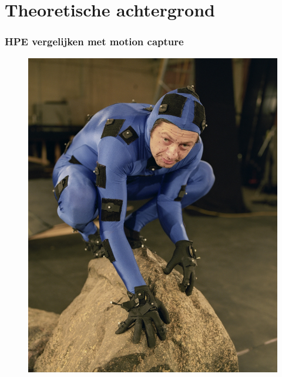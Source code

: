 \documentclass
   [kulak] %
   {kulakbeamer}
\begin{document}
\section[Korte titel]{Theoretische achtergrond}
\begin{frame}
	\frametitle{HPE vergelijken met motion capture}
	\begin{figure}
		\begin{minipage}[b]{.4\linewidth}
			\centering\includegraphics[width= \textwidth]{3D_motion_capture}
			\label{fig:1a}
		\end{minipage}%
		\begin{minipage}[b]{.4\linewidth}
			\centering%
			\label{fig:1b}
		\end{minipage}
	\end{figure}
\end{frame}
\end{document}

